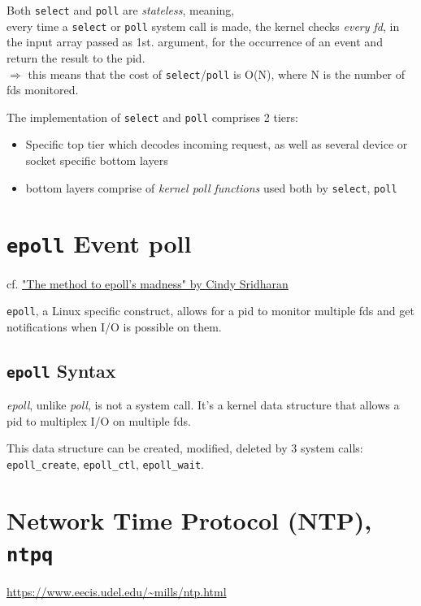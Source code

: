 \documentclass[10pt]{amsart}
\begin{document}
Both \texttt{select} and \texttt{poll} are \emph{stateless}, meaning, \\
every time a \texttt{select} or \texttt{poll} system call is made, the kernel checks \emph{every fd}, in the input array passed as 1st. argument, for the occurrence of an event and return the result to the pid. \\
$\Longrightarrow$ this means that the cost of \texttt{select}/\texttt{poll} is O(N), where N is the number of fds monitored.

The implementation of \texttt{select} and \texttt{poll} comprises 2 tiers:
\begin{itemize}
	\item Specific top tier which decodes incoming request, as well as several device or socket specific bottom layers
	\item bottom layers comprise of \emph{kernel poll functions} used both by \texttt{select}, \texttt{poll}
\end{itemize}

\section{\texttt{epoll} Event poll}

cf. \href{https://medium.com/@copyconstruct/the-method-to-epolls-madness-d9d2d6378642}{"The method to epoll's madness" by Cindy Sridharan}\cite{Srid2017}

\texttt{epoll}, a Linux specific construct, allows for a pid to monitor multiple fds and get notifications when I/O is possible on them. 


\subsection{\texttt{epoll} Syntax}

\emph{epoll}, unlike \emph{poll}, is not a system call. It's a kernel data structure that allows a pid to multiplex I/O on multiple fds.

This data structure can be created, modified, deleted by 3 system calls: \texttt{epoll\_create}, \texttt{epoll\_ctl}, \texttt{epoll\_wait}.

\section{Network Time Protocol (NTP), \texttt{ntpq}}

\url{https://www.eecis.udel.edu/~mills/ntp.html}
\end{document}
